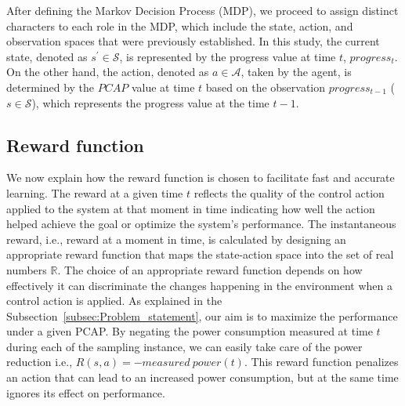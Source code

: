 After defining the Markov Decision Process (MDP), we proceed to assign distinct characters to each role in the MDP, which include the state, action, and observation spaces that were previously established. In this study, the current state, denoted as $s^{'} \in \mathcal{S}$, is represented by the progress value at time $t$, $progress_t$. On the other hand, the action, denoted as $a \in \mathcal{A}$, taken by the agent, is determined by the $PCAP$ value at time $t$ based on the observation $progress_{t-1}$ ($s \in \mathcal{S}$), which represents the progress value at the time $t-1$.

\subsection{Reward function}\label{subsec:Reward_function}
We now explain how the reward function is chosen to facilitate fast and accurate learning.
The reward at a given time $t$ reflects the quality of the control action applied to the system at that moment in time indicating how well the action helped achieve the goal or optimize the system's performance.
The instantaneous reward, i.e., reward at a moment in time, is calculated by designing an appropriate reward function that maps the state-action space into the set of real numbers $\mathbb{R}$. The choice of an appropriate reward function depends on how effectively it can discriminate the changes happening in the environment when a control action is applied. As explained in the Subsection~\ref{subsec:Problem_statement}, our aim is to maximize the performance under a given PCAP. By negating the power consumption measured at time $t$ during each of the sampling instance, we can easily take care of the power reduction i.e., $R(s,a) = - measured \ power (t)$. This reward function penalizes an action that can lead to an increased power consumption, but at the same time ignores its effect on performance. 

